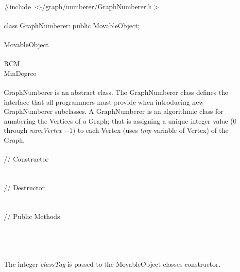 

   \\
\indent \#include $<\tilde{ }$/graph/numberer/GraphNumberer.h$>$  \\

  \\
\indent class GraphNumberer: public MovableObject; \\

 \\
\indent MovableObject \\
\indent{} \\
\indent\indent\indent RCM \\
\indent\indent\indent MinDegree \\

  \\
\indent GraphNumberer is an abstract class. The GraphNumberer
class defines the interface that all programmers must provide when
introducing new GraphNumberer subclasses. A GraphNumberer is an
algorithmic class for numbering the Vertices of a Graph; that is
assigning a unique integer value ($0$ through {\em numVertex} $-1$) to
each Vertex (uses {\em tmp} variable of Vertex) of the Graph. \\


  \\
\indent // Constructor  \\
  \\ \\
\indent // Destructor  \\
  \\ \\
\indent // Public Methods   \\
\\
\\


  \\
  \\
The integer {\em classTag} is passed to the MovableObject classes
constructor.\\ 


